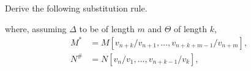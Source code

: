 \begin{exercise}
Derive the following substitution rule.
\begin{prooftree}
\end{prooftree}
where, assuming \(\Delta\) to be of length \(m\) and \(\Theta\) of length \(k\),
\begin{align*}
M^* &= M\left[v_{n+k} / v_{n+1}, \ldots, v_{n+k+m-1} / v_{n+m}\right], \\
N^{\#} &= N\left[v_n / v_1, \ldots, v_{n+k-1} / v_k\right],
\end{align*}
\end{exercise}

